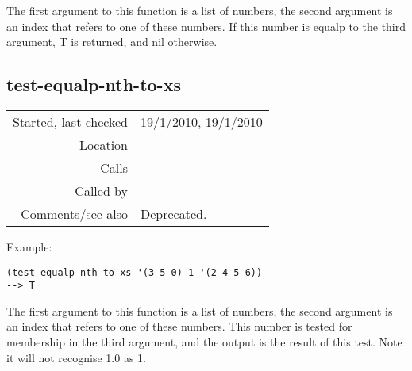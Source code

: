 \noindent The first argument to this function is a
list of numbers, the second argument is an index that
refers to one of these numbers. If this number is
equalp to the third argument, T is returned, and nil
otherwise.


\subsection*{test-equalp-nth-to-xs}\label{fun:test-equalp-nth-to-xs}

\vspace{0.3cm}
\begin{tabular}{r|p{8cm}}
Started, last checked & 19/1/2010, 19/1/2010 \\
Location & \nameref{sec:list-processing} \\
Calls & \\
Called by & \\
Comments/see also & Deprecated.
\end{tabular}

\vspace{0.5cm}
\noindent \noindent Example:
\begin{verbatim}
(test-equalp-nth-to-xs '(3 5 0) 1 '(2 4 5 6))
--> T
\end{verbatim}

\noindent The first argument to this function is a
list of numbers, the second argument is an index that
refers to one of these numbers. This number is tested
for membership in the third argument, and the output
is the result of this test. Note it will not recognise
1.0 as 1.























